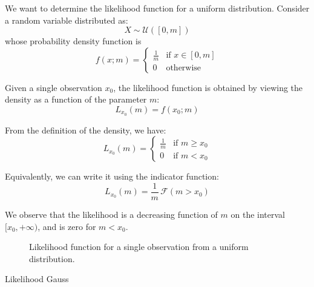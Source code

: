 \begin{example}
	We want to determine the likelihood function for a uniform distribution. Consider a random variable distributed as:
	\[
	X \sim \mathcal{U}([0,m])
	\]
	whose probability density function is
	\[
	f(x;m)=
	\begin{cases}
		\frac{1}{m} & \text{if } x \in [0,m] \\
		0 & \text{otherwise}
	\end{cases}
	\]
	
	Given a single observation $x_0$, the likelihood function is obtained by viewing the density as a function of the parameter $m$:
	\[
	L_{x_0}(m) = f(x_0;m)
	\]
	
	From the definition of the density, we have:
	\[
	L_{x_0}(m)=
	\begin{cases}
		\frac{1}{m} & \text{if } m \ge x_0 \\
		0 & \text{if } m < x_0
	\end{cases}
	\]
	
	Equivalently, we can write it using the indicator function:
	\[
	L_{x_0}(m)=\frac{1}{m}\,\mathscr{F}(m>x_0)
	\]
	
	We observe that the likelihood is a decreasing function of $m$ on the interval $[x_0,+\infty)$, and is zero for $m < x_0$.	
	\begin{figure}[H]
		\centering
		
		\caption{Likelihood function for a single observation from a uniform distribution.}
		\label{fig:uniform_likelihood}
	\end{figure}
\end{example}

\begin{example}
Likelihood Gauss
\end{example}

